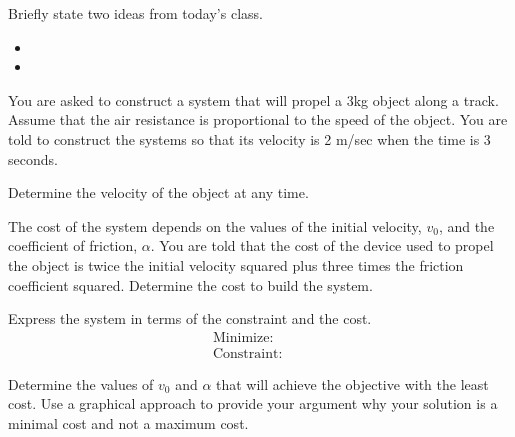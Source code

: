 \postClass

\begin{problem}
\item Briefly state two ideas from today's class.
  \begin{itemize}
  \item
  \item
  \end{itemize}
  \clearpage

\item You are asked to construct a system that will propel a 3kg
  object along a track. Assume that the air resistance is proportional
  to the speed of the object. You are told to construct the systems so
  that its velocity is 2 m/sec when the time is 3 seconds.
  \begin{subproblem}
  \item Determine the velocity of the object at any time.

    \vfill

  \item The cost of the system depends on the values of the initial
    velocity, $v_0$, and the coefficient of friction, $\alpha$. You
    are told that the cost of the device used to propel the object is
    twice the initial velocity squared plus three times the
    friction coefficient squared. Determine the cost to build
    the system.

    \vfill

  \item Express the system in terms of the constraint and the cost.
  \begin{eqnarray*}
    \mathrm{Minimize:}  & &  \\
    \mathrm{Constraint:}  & &
  \end{eqnarray*}
  \item Determine the values of $v_0$ and $\alpha$ that will achieve
    the objective with the least cost. Use a graphical approach to provide
    your argument why your solution is a minimal cost and not a maximum cost.
    \vfill
  \end{subproblem}
\end{problem}




